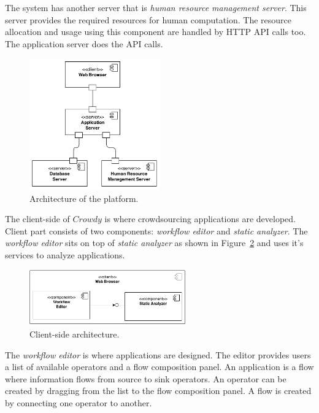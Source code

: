 The system has another server that is \textit{human resource management server}. This 
server provides the required resources for human computation. The resource 
allocation and usage using this component are handled by HTTP API calls too. 
The application server does the API calls.


\begin{figure}[ht]
	\centering
	\includegraphics[width=0.5\textwidth]{figures/architecture/CC1.png}
	\caption{Architecture of the platform.}
	\label{fig:arch}
\end{figure}

The client-side of $Crowdy$ is where crowdsourcing applications are developed. Client 
part consists of two components: \textit{workflow editor} and \textit{static analyzer}. The 
\textit{workflow editor} sits on top of \textit{static analyzer} as shown in 
Figure~\ref{fig:clientdecomposition} and uses it's services to analyze applications.

\begin{figure}[ht]
	\centering
	\includegraphics[width=0.6\textwidth]{figures/architecture/CC2.png}
	\caption{Client-side architecture.}
	\label{fig:clientdecomposition}
\end{figure}

The \textit{workflow editor} is where applications are designed. The editor provides 
users a list of available operators and a flow composition panel. An application is 
a flow where information flows from source to sink operators. An operator can be 
created by dragging from the list to the flow composition panel. A flow is created by 
connecting one operator to another.

